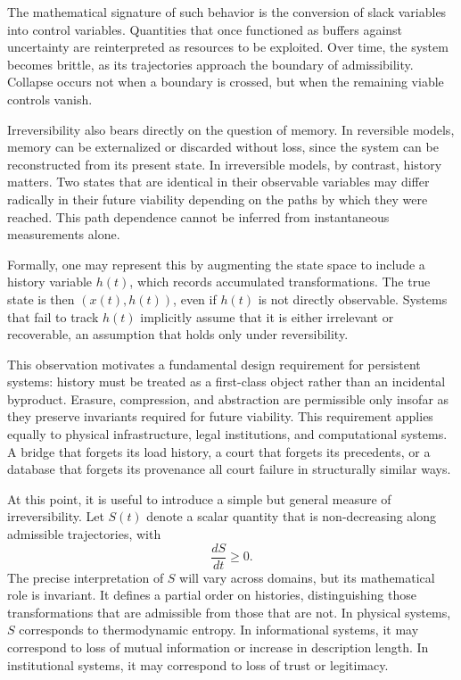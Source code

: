 \documentclass[12pt,oneside]{book}
\begin{document}
The mathematical signature of such behavior is the conversion of slack variables into control variables. Quantities that once functioned as buffers against uncertainty are reinterpreted as resources to be exploited. Over time, the system becomes brittle, as its trajectories approach the boundary of admissibility. Collapse occurs not when a boundary is crossed, but when the remaining viable controls vanish.

Irreversibility also bears directly on the question of memory. In reversible models, memory can be externalized or discarded without loss, since the system can be reconstructed from its present state. In irreversible models, by contrast, history matters. Two states that are identical in their observable variables may differ radically in their future viability depending on the paths by which they were reached. This path dependence cannot be inferred from instantaneous measurements alone.

Formally, one may represent this by augmenting the state space to include a history variable \(h(t)\), which records accumulated transformations. The true state is then \((x(t),h(t))\), even if \(h(t)\) is not directly observable. Systems that fail to track \(h(t)\) implicitly assume that it is either irrelevant or recoverable, an assumption that holds only under reversibility.

This observation motivates a fundamental design requirement for persistent systems: history must be treated as a first-class object rather than an incidental byproduct. Erasure, compression, and abstraction are permissible only insofar as they preserve invariants required for future viability. This requirement applies equally to physical infrastructure, legal institutions, and computational systems. A bridge that forgets its load history, a court that forgets its precedents, or a database that forgets its provenance all court failure in structurally similar ways.

At this point, it is useful to introduce a simple but general measure of irreversibility. Let \(S(t)\) denote a scalar quantity that is non-decreasing along admissible trajectories, with
\[
\frac{dS}{dt} \geq 0.
\]
The precise interpretation of \(S\) will vary across domains, but its mathematical role is invariant. It defines a partial order on histories, distinguishing those transformations that are admissible from those that are not. In physical systems, \(S\) corresponds to thermodynamic entropy. In informational systems, it may correspond to loss of mutual information or increase in description length. In institutional systems, it may correspond to loss of trust or legitimacy.
\end{document}
